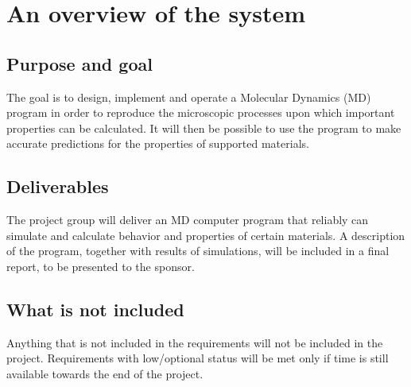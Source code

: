\section{An overview of the system}
\subsection{Purpose and goal}
The goal is to design, implement and operate a Molecular Dynamics (MD) program in order to reproduce the microscopic processes upon which important properties can be calculated.
It will then be possible to use the program to make accurate predictions for the properties of supported materials.

\subsection{Deliverables}
The project group will deliver an MD computer program that reliably can simulate and calculate behavior and properties of certain materials.
A description of the program, together with results of simulations, will be included in a final report, to be presented to the sponsor.

\subsection{What is not included}
Anything that is not included in the requirements will not be included in the project. Requirements with low/optional status will be met only if time is still available towards the end of the project.
